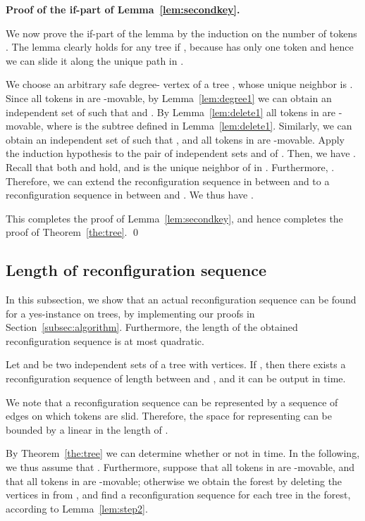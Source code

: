 \documentclass{llncs}
\newcounter{one}
\newcounter{two}
\begin{document}
\smallskip

\noindent
	{\bf Proof of the if-part of Lemma~\ref{lem:secondkey}.}
	
	We now prove the if-part of the lemma by the induction on the number of tokens . 
	The lemma clearly holds for any tree  if , because  has only one token and hence we can slide it along the unique path in . 
	
	We choose an arbitrary safe degree- vertex  of a tree , whose unique neighbor is . 
	Since all tokens in  are -movable, by Lemma~\ref{lem:degree1} we can obtain an independent set  of  such that  and . 
	By Lemma~\ref{lem:delete1} all tokens in  are -movable, where  is the subtree defined in Lemma~\ref{lem:delete1}. 
	Similarly, we can obtain an independent set  of  such that ,  and all tokens in  are -movable. 
	Apply the induction hypothesis to the pair of independent sets  and  of .
	Then, we have .
	Recall that both  and  hold, and  is the unique neighbor of  in .
	Furthermore, . 
	Therefore, we can extend the reconfiguration sequence in  between  and  to a reconfiguration sequence in  between  and . 
	We thus have . 
	
	This completes the proof of Lemma~\ref{lem:secondkey}, and hence completes the proof of Theorem~\ref{the:tree}.
\qed





	\subsection{Length of reconfiguration sequence}
	\label{subsec:length}
	
	In this subsection, we show that an actual reconfiguration sequence can be found for a yes-instance on trees, by implementing our proofs in Section~\ref{subsec:algorithm}.
	Furthermore, the length of the obtained reconfiguration sequence is at most quadratic. 
	\begin{theorem} \label{the:length}
	Let  and  be two independent sets of a tree  with  vertices. 
	If , then there exists a reconfiguration sequence of length  between  and , and it can be output in  time. 
	\end{theorem}
	
	We note that a reconfiguration sequence  can be represented by a sequence of edges on which tokens are slid. 
	Therefore, the space for representing  can be bounded by a linear in the length of . 
	
	By Theorem~\ref{the:tree} we can determine whether  or not in  time. 
	In the following, we thus assume that . 
	Furthermore, suppose that all tokens in  are -movable, and that all tokens in  are -movable;
otherwise we obtain the forest by deleting the vertices in  from , and find a reconfiguration sequence for each tree in the forest, according to Lemma~\ref{lem:step2}. 
\end{document}
